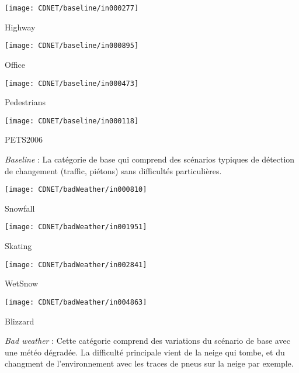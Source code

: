	\begin{figureth}
		\begin{subfigureth}{0.24\textwidth}
			\texttt{[image: CDNET/baseline/in000277]}\caption{Highway}	
		\end{subfigureth}
		\begin{subfigureth}{0.24\textwidth}
			\texttt{[image: CDNET/baseline/in000895]}\caption{Office}	
		\end{subfigureth}
		\begin{subfigureth}{0.24\textwidth}
			\texttt{[image: CDNET/baseline/in000473]}\caption{Pedestrians}	
		\end{subfigureth}
		\begin{subfigureth}{0.24\textwidth}
			\texttt{[image: CDNET/baseline/in000118]}\caption{PETS2006}	
		\end{subfigureth}
		\caption[Catégorie Baseline]{\textit{Baseline} : La catégorie de base qui comprend des scénarios typiques de détection de changement (traffic, piétons) sans difficultés particulières.}\label{fig:cdnet:baseline}
	\end{figureth}

	\begin{figureth}
		\begin{subfigureth}{0.24\textwidth}
			\texttt{[image: CDNET/badWeather/in000810]}\caption{Snowfall}	
		\end{subfigureth}
		\begin{subfigureth}{0.24\textwidth}
			\texttt{[image: CDNET/badWeather/in001951]}\caption{Skating}	
		\end{subfigureth}
		\begin{subfigureth}{0.24\textwidth}
			\texttt{[image: CDNET/badWeather/in002841]}\caption{WetSnow}	
		\end{subfigureth}
		\begin{subfigureth}{0.24\textwidth}
			\texttt{[image: CDNET/badWeather/in004863]}\caption{Blizzard}	
		\end{subfigureth}
		\caption[Catégorie Bad weather]{\textit{Bad weather} : Cette catégorie comprend des variations du scénario de base avec une météo dégradée. La difficulté principale vient de la neige qui tombe, et du changment de l'environnement avec les traces de pneus sur la neige par exemple.}\label{fig:cdnet:badweather}
	\end{figureth}

